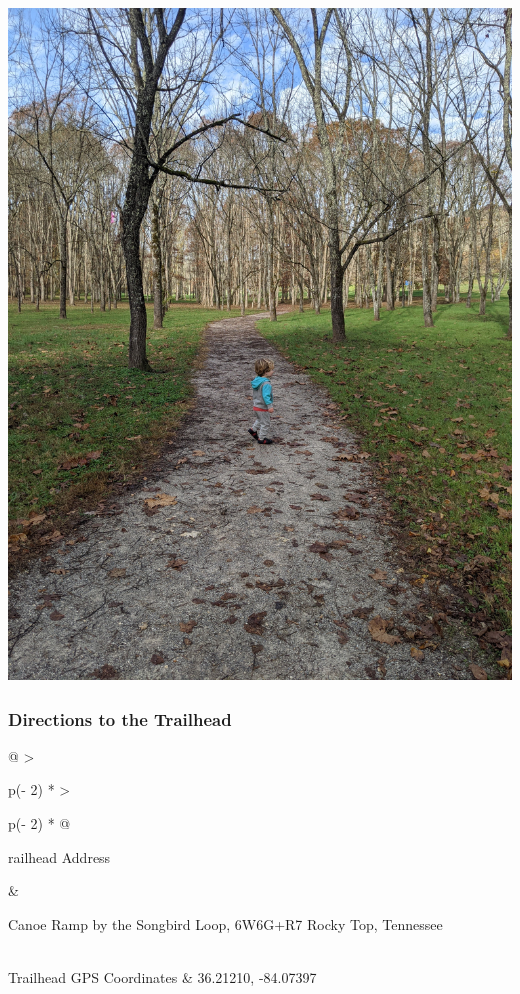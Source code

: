 \documentclass[
  letterpaper,
  DIV=11,
  numbers=noendperiod]{scrartcl}
\begin{document}
\includegraphics{img/trail-11-figure-01.jpg}

\hypertarget{directions-to-the-trailhead-10}{%
\subsubsection{Directions to the
Trailhead}\label{directions-to-the-trailhead-10}}

\begin{longtable}[]{@{}
  >{\raggedright\arraybackslash}p{(\columnwidth - 2\tabcolsep) * }
  >{\raggedright\arraybackslash}p{(\columnwidth - 2\tabcolsep) * }@{}}
\toprule\noalign{}
\begin{minipage}[b]{\linewidth}\raggedright
railhead Address
\end{minipage} & \begin{minipage}[b]{\linewidth}\raggedright
Canoe Ramp by the Songbird Loop, 6W6G+R7 Rocky Top, Tennessee
\end{minipage} \\
\midrule\noalign{}
\endhead
\bottomrule\noalign{}
\endlastfoot
Trailhead GPS Coordinates & 36.21210, -84.07397 \\
\end{longtable}
\end{document}
